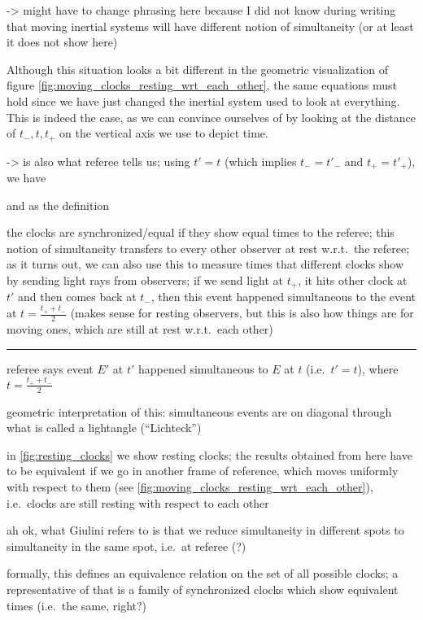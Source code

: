-> might have to change phrasing here because I did not know during writing that moving inertial systems will have different notion of simultaneity (or at least it does not show here)


Although this situation looks a bit different in the geometric visualization of figure \ref{fig:moving_clocks_resting_wrt_each_other}, the same equations must hold since we have just changed the inertial system used to look at everything. This is indeed the case, as we can convince ourselves of by looking at the distance of $t_-, t, t_+$ on the vertical axis we use to depict time.


-> is also what referee tells us; using $t' = t$ (which implies $t_- = t'_-$ and $t_+ = t'_+$), we have


and as the definition



the clocks are synchronized/equal if they show equal times to the referee; this notion of simultaneity transfers to every other observer at rest w.r.t.~the referee; as it turns out, we can also use this to measure times that different clocks show by sending light rays from observers; if we send light at $t_+$, it hits other clock at $t'$ and then comes back at $t_-$, then this event happened simultaneous to the event at $t = \frac{t_+ + t_-}{2}$ (makes sense for resting observers, but this is also how things are for moving ones, which are still at rest w.r.t.~each other)


\hrule


referee says event $E'$ at $t'$ happened simultaneous to $E$ at $t$ (i.e.~$t' = t$), where $t = \frac{t_+ + t_-}{2}$

geometric interpretation of this: simultaneous events are on diagonal through what is called a lightangle (\enquote{Lichteck})


in \ref{fig:resting_clocks} we show resting clocks; the results obtained from here have to be equivalent if we go in another frame of reference, which moves uniformly with respect to them (see \ref{fig:moving_clocks_resting_wrt_each_other}), i.e.~clocks are still resting with respect to each other


ah ok, what Giulini refers to is that we reduce simultaneity in different spots to simultaneity in the same spot, i.e.~at referee (?)


formally, this defines an equivalence relation on the set of all possible clocks; a representative of that is a family of synchronized clocks which show equivalent times (i.e.~the same, right?)



